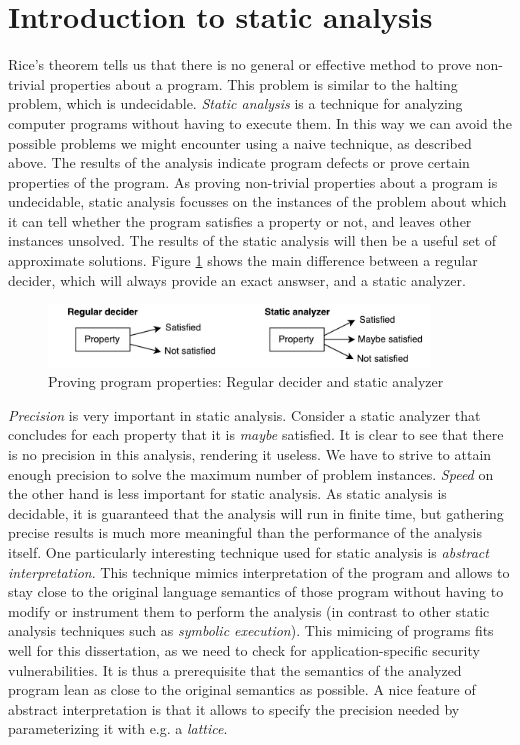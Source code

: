 \section{Introduction to static analysis}
\label{sec:staticAnalysis}
Rice's theorem tells us that there is no general or effective method to prove non-trivial properties about a program. This problem is similar to the halting problem, which is undecidable. \textit{Static analysis} is a technique for analyzing computer programs without having to execute them. In this way we can avoid the possible problems we might encounter using a naive technique, as described above. The results of the analysis indicate program defects or prove certain properties of the program. As proving non-trivial properties about a program is undecidable, static analysis focusses on the instances of the problem about which it can tell whether the program satisfies a property or not, and leaves other instances unsolved. The results of the static analysis will then be a useful set of approximate solutions. Figure \ref{fig:decider} shows the main difference between a regular decider, which will always provide an exact answser, and a static analyzer.

\begin{figure}[!h]
    \centering
      \includegraphics[width=0.9\textwidth]{images/decider} 
      \caption{Proving program properties: Regular decider and static analyzer}
    \label{fig:decider}
\end{figure}

\textit{Precision} is very important in static analysis. Consider a static analyzer that concludes for each property that it is \textit{maybe} satisfied. It is clear to see that there is no precision in this analysis, rendering it useless. We have to strive to attain enough precision to solve the maximum number of problem instances. \textit{Speed} on the other hand is less important for static analysis. As static analysis is decidable, it is guaranteed that the analysis will run in finite time, but gathering precise results is much more meaningful than the performance of the analysis itself. 
One particularly interesting technique used for static analysis is \textit{abstract interpretation}. This technique mimics interpretation of the program and allows to stay close to the original language semantics of those program without having to modify or instrument them to perform the analysis (in contrast to other static analysis techniques such as \textit{symbolic execution}). This mimicing of programs fits well for this dissertation, as we need to check for application-specific security vulnerabilities. It is thus a prerequisite that the semantics of the analyzed program lean as close to the original semantics as possible. A nice feature of abstract interpretation is that it allows to specify the precision needed by parameterizing it with e.g. a \textit{lattice}.

